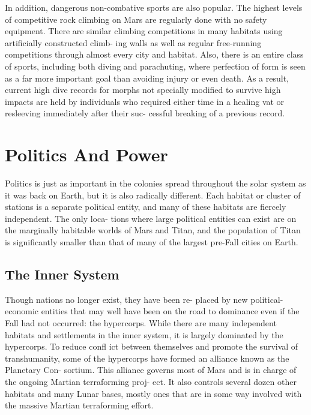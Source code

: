 In addition, dangerous non-combative sports are 
also popular. The highest levels of competitive rock 
climbing on Mars are regularly done with no safety 
equipment. There are similar climbing competitions 
in many habitats using artificially constructed climb-
ing walls as well as regular free-running competitions 
through almost every city and habitat. Also, there is 
an entire class of sports, including both diving and 
parachuting, where perfection of form is seen as 
a far more important goal than avoiding injury or 
even death. As a result, current high dive records for 
morphs not specially modified to survive high impacts 
are held by individuals who required either time in a 
healing vat or resleeving immediately after their suc-
cessful breaking of a previous record.

\section{Politics And Power}

Politics is just as important in the colonies spread 
throughout the solar system as it was back on Earth, 
but it is also radically different. Each habitat or cluster 
of stations is a separate political entity, and many of 
these habitats are fiercely independent. The only loca-
tions where large political entities can exist are on the 
marginally habitable worlds of Mars and Titan, and 
the population of Titan is significantly smaller than 
that of many of the largest pre-Fall cities on Earth.

\subsection{The Inner System}

Though nations no longer exist, they have been re-
placed by new political-economic entities that may 
well have been on the road to dominance even if the 
Fall had not occurred: the hypercorps. While there 
are many independent habitats and settlements in the 
inner system, it is largely dominated by the hypercorps. 
To reduce confl ict between themselves and promote 
the survival of transhumanity, some of the hypercorps 
have formed an alliance known as the Planetary Con-
sortium. This alliance governs most of Mars and is 
in charge of the ongoing Martian terraforming proj-
ect. It also controls several dozen other habitats and 
many Lunar bases, mostly ones that are in some way 
involved with the massive Martian terraforming effort.

